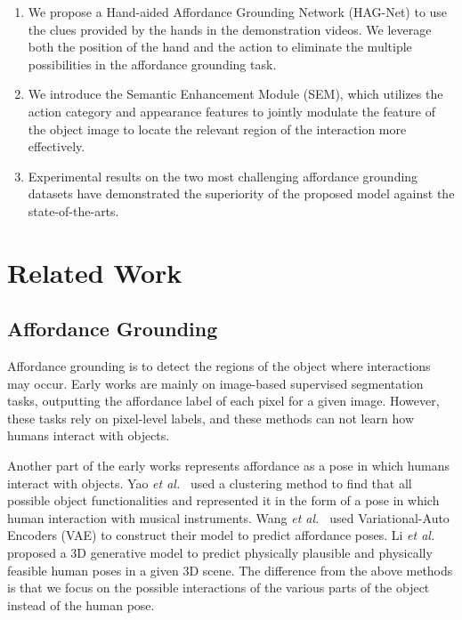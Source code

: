 \documentclass[journal,twoside]{IEEEtran}
\def\etal{{\em et al.~}}
\begin{document}
\begin{enumerate}

\item 
We propose a Hand-aided Affordance Grounding Network (HAG-Net) to use the clues provided by the hands in the demonstration videos. We leverage both the position of the hand and the action to eliminate the multiple possibilities in the affordance grounding task. 

\item 
We introduce the Semantic Enhancement Module (SEM), which utilizes the action category and appearance features to jointly modulate the feature of the object image to locate the relevant region of the interaction more effectively.

\item 
Experimental results on the two most challenging affordance grounding datasets have demonstrated the superiority of the proposed model against the state-of-the-arts.

\end{enumerate}

\section{Related Work}
\subsection{Affordance Grounding}
Affordance grounding is to detect the regions of the object where interactions may occur. Early works \cite{DBLP:KoppulaS14,DBLP:conf/iros/NguyenKCT17,8460902,2019Object} are mainly on image-based supervised segmentation tasks, outputting the affordance label of each pixel for a given image. However, these tasks rely on pixel-level labels, and these methods can not learn how humans interact with objects.

Another part of the early works represents affordance as a pose in which humans interact with objects. Yao \etal \cite{DBLP:conf/iccv/YaoMF13} used a clustering method to find that all possible object functionalities and represented it in the form of a pose in which human interaction with musical instruments. Wang \etal \cite{Wang_affordanceCVPR2017} used Variational-Auto Encoders (VAE) to construct their model to predict affordance poses. Li \etal \cite{3d-affordance} proposed a 3D generative model to predict physically plausible and physically feasible human poses in a given 3D scene. The difference from the above methods is that we focus on the possible interactions of the various parts of the object instead of the human pose. 
\end{document}
